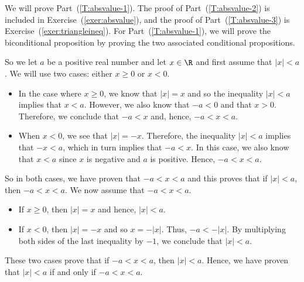 \begin{myproof}
We will prove Part~(\ref{T:absvalue-1}).  The proof of Part~(\ref{T:absvalue-2}) is included in Exercise~(\ref{exer:absvalue}), and the proof of Part~(\ref{T:absvalue-3}) is Exercise~(\ref{exer:triangleineq}).  
For Part~(\ref{T:absvalue-1}), we will prove the biconditional proposition by proving the two associated conditional propositions.

So we let $a$ be a positive real number and let $x \in \R$ and first assume that 
$\left| x \right| < a$.  We will use two cases:  either $x \geq 0$ or $x < 0$.

\begin{itemize}
\item In the case where $x \geq 0$, we know that $\left| x \right| = x$ and so the inequality 
$\left| x \right| < a$ implies that $x < a$.  However, we also know that $-a < 0$ and that 
$x > 0$.  Therefore, we conclude that $-a < x$ and, hence, $-a < x < a$.

\item When $x < 0$, we see that $\left| x \right| = -x$.  Therefore, the inequality 
$\left| x \right| < a$ implies that $-x < a$, which in turn implies that $-a < x$.  In this case, we also know that $x < a$ since $x$ is negative and $a$ is positive.  Hence, 
$-a < x < a$.
\end{itemize}

So in both cases, we have proven that $-a < x < a$ and this proves that if 
$\left| x \right| < a$, then $-a < x < a$.
We now assume that $-a < x < a$.
\begin{itemize}
\item If $x \geq 0$, then $\left| x \right| = x$ and hence, $\left| x \right| < a$.
\item If $x < 0$, then $\left| x \right| = -x$ and so $x = -\left| x \right|$.  Thus, 
$-a < - \left| x \right|$.  By multiplying both sides of the last inequality by $-1$, we conclude that $\left| x \right| < a$.
\end{itemize}

These two cases prove that if $-a < x < a$, then $\left| x \right| < a$.  Hence, we have proven that $\left| x \right| < a$ if and only if $-a < x < a$.
\end{myproof}
\hbreak


